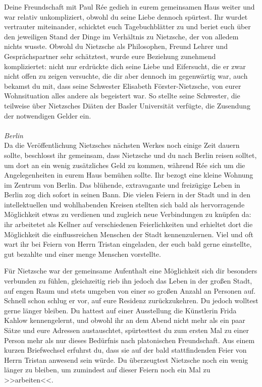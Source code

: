 \documentclass[12pt, a4paper, openany]{report}
\begin{document}
Deine Freundschaft mit Paul Rée gedieh in eurem gemeinsamen Haus weiter und war relativ unkompliziert, obwohl du seine Liebe dennoch spürtest. 
Ihr wurdet vertrauter miteinander, schicktet euch Tagebuchblätter zu und beriet euch über den jeweiligen Stand der Dinge im Verhältnis zu Nietzsche, der von alledem nichts wusste. 
Obwohl du Nietzsche als Philosophen, Freund Lehrer und Gesprächspartner sehr schätztest, wurde eure Beziehung zunehmend kompliziertet:
nicht nur erdrückte dich seine Liebe und Eifersucht, die er zwar nicht offen zu zeigen versuchte, die dir aber dennoch im gegenwärtig war, auch bekamst du mit, dass seine Schwester Elisabeth Förster-Nietzsche, von eurer Wohnsituation alles andere als begeistert war.
So stellte seine Schwester, die teilweise über Nietzsches Diäten der Basler Universität verfügte, die Zusendung der notwendigen Gelder ein.
\\
\\
\textit{Berlin}\\
Da die Veröffentlichung Nietzsches nächsten Werkes noch einige Zeit dauern sollte, beschlosst ihr gemeinsam, dass Nietzsche und du nach Berlin reisen solltet, um dort an ein wenig zusätzliches Geld zu kommen, während Rée sich um die Angelegenheiten in eurem Haus bemühen sollte.
Ihr bezogt eine kleine Wohnung im Zentrum von Berlin. 
Das blühende, extravagante und freizügige Leben in Berlin zog dich sofort in seinen Bann. 
Die vielen Feiern in der Stadt und in den intellektuellen und wohlhabenden Kreisen stellten sich bald als hervorragende Möglichkeit etwas zu verdienen und zugleich neue Verbindungen zu knüpfen da:
ihr arbeitetet als Kellner auf verschiedenen Feierlichkeiten und erhieltet dort die Möglichkeit die einflussreichen Menschen der Stadt kennenzulernen. 
Viel und oft wart ihr bei Feiern von Herrn Tristan eingeladen, der euch bald gerne einstellte, gut bezahlte und einer menge Menschen vorstellte.

Für Nietzsche war der gemeinsame Aufenthalt eine Möglichkeit sich dir besonders verbunden zu fühlen, gleichzeitig rieb ihn jedoch das Leben in der großen Stadt, auf engen Raum und stets umgeben von einer so großen Anzahl an Personen auf. 
Schnell schon schlug er vor, auf eure Residenz zurückzukehren. 
Du jedoch wolltest gerne länger bleiben.
Du hattest auf einer Ausstellung die Künstlerin Frida Kahlow kennengelernt, und obwohl ihr an dem Abend nicht mehr als ein paar Sätze und eure Adressen austauschtet, spürtesttest du zum ersten Mal zu einer Person mehr als nur dieses Bedürfnis nach platonischen Freundschaft. 
Aus einem kurzen Briefwechsel erfuhrst du, dass sie auf der bald stattfindenden Feier von Herrn Tristan anwesend sein würde. 
Du überzeugtest Nietzsche noch ein wenig länger zu bleiben, um zumindest auf dieser Feiern noch ein Mal zu >>arbeiten<<.
\end{document}
